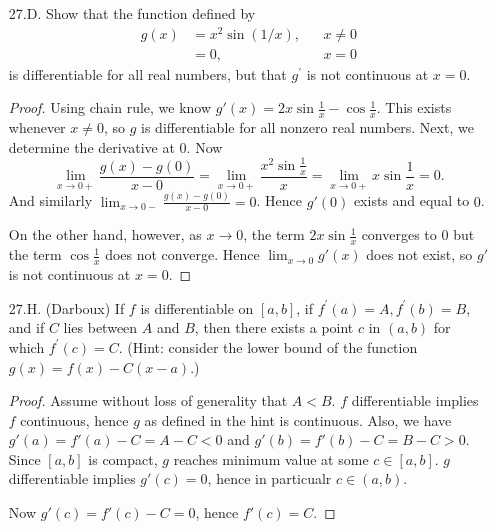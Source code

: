\begin{itemize}
\begin{proof}
	Now let $x, y\ge  0$ such that $|x - y| < \delta$. If $x,y \le  N$ then we are done. If $x, y > N$ then by triangle inequality we have $|f(x) - f(y)| < \varepsilon$. If $x \le  N$ and $y\ge N$, then $|x - N| \le  \delta$. Hence $|f(x) - f(y)|\le |f(x) - f(N)| + |f(N) - f(y)| \le  \varepsilon + \varepsilon = 2 \varepsilon$. Therefore $f$ is uniformly continuous on $[0, +\infty )$.
\end{proof}

\item [27.D.] Show that the function defined by
\[
\begin{aligned}
g(x) &=x^2 \sin (1 / x), & & x \neq 0 \\
&=0, & & x=0
\end{aligned}
\]
is differentiable for all real numbers, but that $g^{\prime}$ is not continuous at $x=0$.
\begin{proof}
	Using chain rule, we know  $g'(x) = 2x \sin \frac{1}{x} - \cos \frac{1}{x}$. This exists whenever $x\neq 0$, so $g$ is differentiable for all nonzero real numbers. 
	Next, we determine the derivative at $0$. Now
	\[
		\lim_{x \to 0+} \frac{g(x) - g(0)}{x - 0} = \lim_{x \to 0+} \frac{x^2 \sin \frac{1}{x}}{x} = \lim_{x \to 0+} x \sin \frac{1}{x} = 0
	.\] 
	And similarly $\lim_{x \to 0-} \frac{g(x) - g(0)}{x - 0} = 0$. Hence $g'(0)$ exists and equal to $0$.

	On the other hand, however, as $x \to 0$, the term $2x \sin \frac{1}{x}$ converges to $0$ but the term $\cos \frac{1}{x}$ does not converge. Hence $\lim_{x \to 0} g'(x)$ does not exist, so $g'$ is not continuous at $x = 0$.
\end{proof}

\item [27.H.] (Darboux) If $f$ is differentiable on $[a, b]$, if $f^{\prime}(a)=A, f^{\prime}(b)=B$, and if $C$ lies between $A$ and $B$, then there exists a point $c$ in $(a, b)$ for which $f^{\prime}(c)=C$. (Hint: consider the lower bound of the function $g(x)=f(x)-C(x-a)$.)
\begin{proof}
	Assume without loss of generality that $A < B$. $f$ differentiable implies $f$ continuous, hence $g$ as defined in the hint is continuous. Also, we have $g'(a) = f'(a) - C = A - C < 0$ and $g'(b) = f'(b) - C = B - C > 0$. Since $[a,b]$ is compact, $g$ reaches minimum value at some $c \in [a,b]$. $g$ differentiable implies $g'(c) = 0$, hence  in particualr $c \in (a,b)$.  

	Now $g'(c) = f'(c) - C = 0$, hence $f'(c) = C$.
\end{proof}


\end{itemize}
